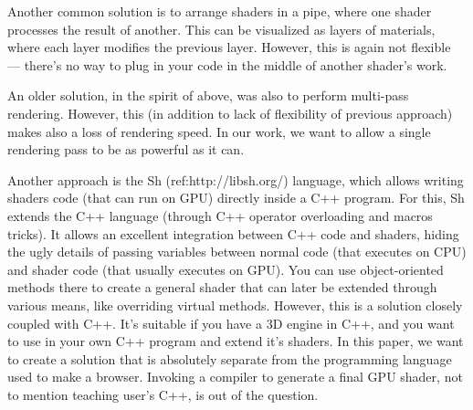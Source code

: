 \documentclass{acmsiggraph}                     %
\begin{document}
Another common solution is to arrange shaders in a pipe, where one
shader processes the result of another. This can be visualized as
layers of materials, where each layer modifies the previous
layer. However, this is again not flexible --- there's no way to plug
in your code in the middle of another shader's work.

An older solution, in the spirit of above, was also to perform
multi-pass rendering. However, this (in addition to lack of
flexibility of previous approach) makes also a loss of rendering
speed. In our work, we want to allow a single rendering pass to be as
powerful as it can.


Another approach is the Sh (ref:http://libsh.org/) language, which
allows writing shaders code (that can run on GPU) directly inside a
C++ program. For this, Sh extends the C++ language (through C++
operator overloading and macros tricks). It allows an excellent
integration between C++ code and shaders, hiding the ugly details of
passing variables between normal code (that executes on CPU) and
shader code (that usually executes on GPU). You can use
object-oriented methods there to create a general shader that can
later be extended through various means, like overriding virtual
methods. However, this is a solution closely coupled with C++. It's
suitable if you have a 3D engine in C++, and you want to use in your
own C++ program and extend it's shaders. In this paper, we want to
create a solution that is absolutely separate from the programming
language used to make a browser. Invoking a compiler to generate a
final GPU shader, not to mention teaching user's C++, is out of the
question.

\end{document}
